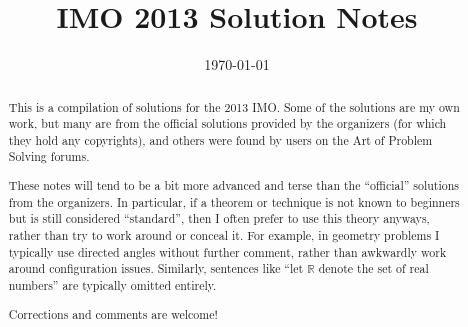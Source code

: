 \documentclass[11pt]{scrartcl}
\title{IMO 2013 Solution Notes}
\date{\today}
\begin{document}
\maketitle

\begin{abstract}
This is a compilation of solutions
for the 2013 IMO.
Some of the solutions are my own work,
but many are from the official solutions provided by the organizers
(for which they hold any copyrights),
and others were found by users on the Art of Problem Solving forums.

These notes will tend to be a bit more advanced and terse than the ``official''
solutions from the organizers.
In particular, if a theorem or technique is not known to beginners
but is still considered ``standard'', then I often prefer to
use this theory anyways, rather than try to work around or conceal it.
For example, in geometry problems I typically use directed angles
without further comment, rather than awkwardly work around configuration issues.
Similarly, sentences like ``let $\mathbb{R}$ denote the set of real numbers''
are typically omitted entirely.

Corrections and comments are welcome!
\end{abstract}

\tableofcontents
\newpage

\addtocounter{section}{-1}
\end{document}

